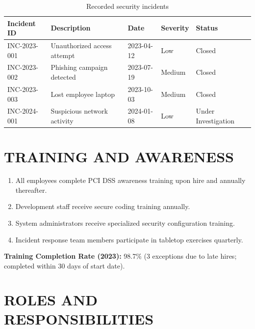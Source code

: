 \documentclass[
    language=english,
    doctype=compliance-document,
    institution=none,
]{../../omnilatex}
\begin{document}
\begin{table}[h]
\centering
\small
\begin{tabular}{p{2.5cm}p{3.5cm}p{2cm}p{2cm}p{2.5cm}}
\toprule
\textbf{Incident ID} & \textbf{Description} & \textbf{Date} & \textbf{Severity} & \textbf{Status} \\
\midrule
INC-2023-001 & Unauthorized access attempt & 2023-04-12 & Low & Closed \\
INC-2023-002 & Phishing campaign detected & 2023-07-19 & Medium & Closed \\
INC-2023-003 & Lost employee laptop & 2023-10-03 & Medium & Closed \\
INC-2024-001 & Suspicious network activity & 2024-01-08 & Low & Under Investigation \\
\bottomrule
\end{tabular}
\caption{Recorded security incidents}
\end{table}

\section{TRAINING AND AWARENESS}

\begin{enumerate}
    \item All employees complete PCI DSS awareness training upon hire and annually thereafter.
    \item Development staff receive secure coding training annually.
    \item System administrators receive specialized security configuration training.
    \item Incident response team members participate in tabletop exercises quarterly.
\end{enumerate}

\textbf{Training Completion Rate (2023):} 98.7\% (3 exceptions due to late hires; completed within 30 days of start date).

\section{ROLES AND RESPONSIBILITIES}
\end{document}
